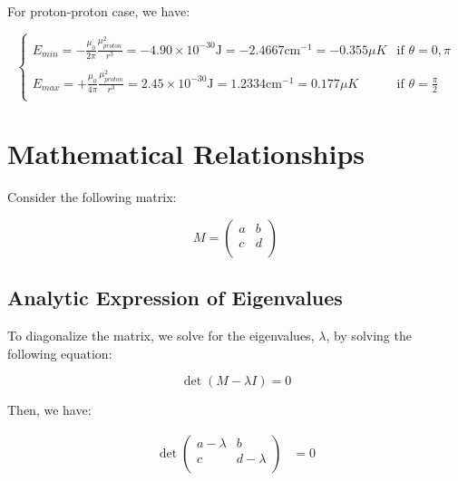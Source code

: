 \documentclass[11pt]{article}
\begin{document}
  For proton-proton case, we have:

  \begin{equation}
    \begin{cases}
      \displaystyle
      E_{min} = -\frac{\mu_0}{2\pi} \frac{\mu_{proton}^2}{r^3} = -4.90 \times 10^{-30} \text{J} = -2.4667 \text{cm}^{-1} = -0.355 \mu K & \text{if } \theta = 0, \pi \\
      \\
      \displaystyle
      E_{max} = +\frac{\mu_0}{4\pi} \frac{\mu_{proton}^2}{r^3} = 2.45 \times 10^{-30} \text{J} = 1.2334 \text{cm}^{-1} = 0.177 \mu K & \text{if } \theta = \frac{\pi}{2}\\
    \end{cases}
  \end{equation}

  \section{Mathematical Relationships}

  Consider the following matrix:

  \begin{equation}
    M = 
    \begin{pmatrix}
      a & b \\
      c & d \\
    \end{pmatrix}
  \end{equation}

  \subsection{Analytic Expression of Eigenvalues}

  To diagonalize the matrix, we solve for the eigenvalues, $\lambda$, by solving the following equation:

  \begin{equation}
    \det(M - \lambda I) = 0
  \end{equation}

  Then, we have:

  \begin{align*}
    \det
    \begin{pmatrix}
      a - \lambda & b \\
      c & d - \lambda \\
    \end{pmatrix}
    &= 0 \\
  \end{align*}
\end{document}
